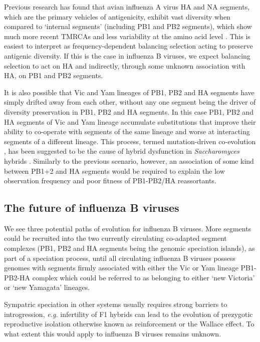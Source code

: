 \documentclass[11pt,oneside,letterpaper]{article}
\begin{document}
Previous research has found that avian influenza A virus HA and NA segments, which are the primary vehicles of antigenicity, exhibit vast diversity when compared to `internal segments' (including PB1 and PB2 segments), which show much more recent TMRCAs and less variability at the amino acid level \cite{chen2006,obenauer2006}.
This is easiest to interpret as frequency-dependent balancing selection acting to preserve antigenic diversity.
If this is the case in influenza B viruses, we expect balancing selection to act on HA and indirectly, through some unknown association with HA, on PB1 and PB2 segments.

It is also possible that Vic and Yam lineages of PB1, PB2 and HA segments have simply drifted away from each other, without any one segment being the driver of diversity preservation in PB1, PB2 and HA segments.
In this case PB1, PB2 and HA segments of Vic and Yam lineage accumulate substitutions that improve their ability to co-operate with segments of the same lineage and worse at interacting segments of a different lineage.
This process, termed mutation-driven co-evolution \cite{presgraves2010}, has been suggested to be the cause of hybrid dysfunction in \textit{Saccharomyces} hybrids \cite{lee2008}.
Similarly to the previous scenario, however, an association of some kind between PB1+2 and HA segments would be required to explain the low observation frequency and poor fitness of PB1-PB2/HA reassortants.

\subsection*{The future of influenza B viruses}
We see three potential paths of evolution for influenza B viruses.
More segments could be recruited into the two currently circulating co-adapted segment complexes (PB1, PB2 and HA segments being the genomic speciation islands), as part of a speciation process, until all circulating influenza B viruses possess genomes with segments firmly associated with either the Vic or Yam lineage PB1-PB2-HA complex which could be referred to as belonging to either `new Victoria' or `new Yamagata' lineages.

Sympatric speciation in other systems usually requires strong barriers to introgression, \textit{e.g.} infertility of F1 hybrids can lead to the evolution of prezygotic reproductive isolation otherwise known as reinforcement or the Wallace effect.
To what extent this would apply to influenza B viruses remains unknown.
\end{document}

